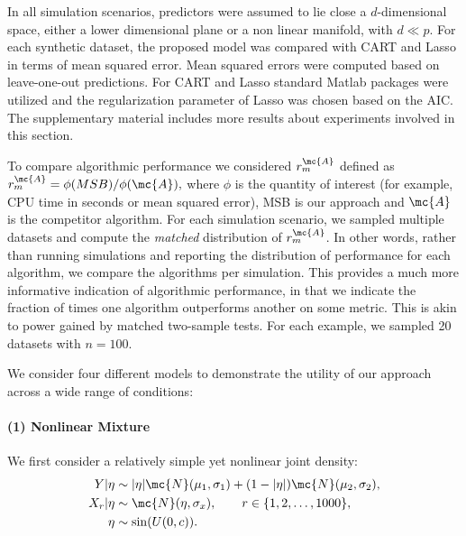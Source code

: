 In all simulation scenarios, predictors were assumed to lie close a $d$-dimensional space, either a lower dimensional plane or a non linear manifold, with $d \ll p$. For each synthetic dataset, the proposed model was compared with CART and Lasso in terms of mean squared error. Mean squared errors were computed based on leave-one-out predictions. For CART and Lasso standard Matlab packages were utilized  and the regularization parameter of Lasso was chosen based on the AIC. The supplementary material includes more results about experiments involved in this section.

To compare algorithmic performance we considered $r_{m}^{\mc{A}}$ defined as $r_{m}^{\mc{A}}=\phi(MSB)/\phi(\mc{A}),$
where $\phi$ is the quantity of interest (for example, CPU time in seconds or mean squared error), MSB is our approach and $\mc{A}$ is the competitor algorithm. For each simulation scenario, we sampled multiple datasets and compute the \emph{matched} distribution of $r_{m}^{\mc{A}}$. In other words, rather than running simulations and reporting the distribution of performance for each algorithm, we compare the algorithms per simulation.  This provides a much more informative indication of algorithmic performance, in that we indicate the fraction of times one algorithm outperforms another on some metric.  This is akin to power gained by matched two-sample tests.   For each example, we sampled 20 datasets with $n=100$.

We consider four different models to demonstrate the utility of our approach across a wide range of conditions:

\paragraph{(1) Nonlinear Mixture}
%
We first consider a relatively simple yet nonlinear joint density:
\begin{subequations}
\begin{align}
	Y|\eta &\sim   |\eta| \mc{N}(\mu_1,\sigma_1) + (1-|\eta|) \mc{N}(\mu_2,\sigma_2), \\
	X_r|\eta  &\sim \mc{N}(\eta, \sigma_x), \qquad r \in \{1, 2, \ldots, 1000\}, \\
	\eta  &\sim \sin(U(0,c)). %
\end{align}
\end{subequations}




